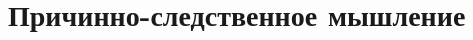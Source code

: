 \documentclass[aspectratio=169]{beamer}
\begin{document}
\section{Причинно-следственное мышление}
\end{document}
